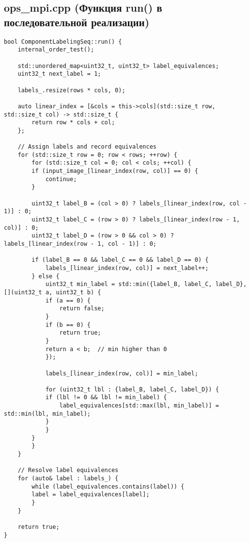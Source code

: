 \documentclass[a4paper,12pt]{article}
\begin{document}
\subsection{ops\_mpi.cpp (Функция run() в последовательной реализации)}
\begin{lstlisting}
bool ComponentLabelingSeq::run() {
    internal_order_test();
    
    std::unordered_map<uint32_t, uint32_t> label_equivalences;
    uint32_t next_label = 1;
    
    labels_.resize(rows * cols, 0);
    
    auto linear_index = [&cols = this->cols](std::size_t row, std::size_t col) -> std::size_t {
        return row * cols + col;
    };
    
    // Assign labels and record equivalences
    for (std::size_t row = 0; row < rows; ++row) {
        for (std::size_t col = 0; col < cols; ++col) {
        if (input_image_[linear_index(row, col)] == 0) {
            continue;
        }
    
        uint32_t label_B = (col > 0) ? labels_[linear_index(row, col - 1)] : 0;
        uint32_t label_C = (row > 0) ? labels_[linear_index(row - 1, col)] : 0;
        uint32_t label_D = (row > 0 && col > 0) ? labels_[linear_index(row - 1, col - 1)] : 0;
    
        if (label_B == 0 && label_C == 0 && label_D == 0) {
            labels_[linear_index(row, col)] = next_label++;
        } else {
            uint32_t min_label = std::min({label_B, label_C, label_D}, [](uint32_t a, uint32_t b) {
            if (a == 0) {
                return false;
            }
            if (b == 0) {
                return true;
            }
            return a < b;  // min higher than 0
            });
    
            labels_[linear_index(row, col)] = min_label;
    
            for (uint32_t lbl : {label_B, label_C, label_D}) {
            if (lbl != 0 && lbl != min_label) {
                label_equivalences[std::max(lbl, min_label)] = std::min(lbl, min_label);
            }
            }
        }
        }
    }
    
    // Resolve label equivalences
    for (auto& label : labels_) {
        while (label_equivalences.contains(label)) {
        label = label_equivalences[label];
        }
    }
    
    return true;
}
\end{lstlisting}
\end{document}
